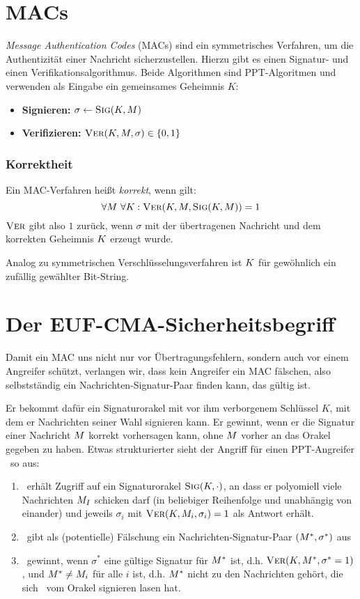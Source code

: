 \section{MACs}
\label{ch:symauth:macs} 
\textit{Message Authentication Codes} (MACs) sind ein symmetrisches
Verfahren, um die Authentizität einer Nachricht sicherzustellen. Hierzu
gibt es einen Signatur- und einen Verifikationsalgorithmus. Beide
Algorithmen sind PPT-Algoritmen und verwenden als Eingabe ein
gemeinsames Geheimnis $K$: 

\begin{itemize}
\item \textbf{Signieren:} $\sigma \leftarrow \textsc{Sig}(K,M)$
\item \textbf{Verifizieren:} $\textsc{Ver}(K,M,\sigma) \in \{0,1\}$
\end{itemize} 
\subsubsection*{Korrektheit}
Ein MAC-Verfahren heißt \textit{korrekt}, wenn gilt:
\[
\forall M~\forall K: \textsc{Ver}(K, M, \textsc{Sig}(K, M)) =1
\]
$\textsc{Ver}$ gibt also $1$ zurück, wenn $\sigma$ mit der übertragenen
Nachricht und  dem korrekten Geheimnis $K$ erzeugt wurde.

Analog zu symmetrischen Verschlüsselungsverfahren ist $K$ für gewöhnlich
ein zufällig gewählter Bit-String.
\section{Der EUF-CMA-Sicherheitsbegriff}
\label{ch:symauth:sicherheit} Damit ein MAC uns nicht nur vor
Übertragungsfehlern, sondern auch vor einem Angreifer schützt, verlangen
wir, dass kein Angreifer ein MAC fälschen, also selbstständig ein Nachrichten-Signatur-Paar
finden kann, das gültig ist.

Er bekommt dafür ein Signaturorakel mit vor ihm verborgenem Schlüssel
$K$, mit dem er Nachrichten seiner Wahl signieren kann. Er gewinnt, wenn
er die Signatur einer Nachricht $M$ korrekt vorhersagen kann, ohne $M$
vorher an das Orakel gegeben zu haben. Etwas strukturierter sieht der
Angriff für einen PPT-Angreifer \A~so aus:
\begin{enumerate}
\item \A~erhält Zugriff auf ein Signaturorakel
  $\textsc{Sig}(K,\cdot)$, an dass er polyomiell viele Nachrichten $M_I$
  schicken darf (in beliebiger Reihenfolge und unabhängig von einander)
  und jeweils $\sigma_i$ mit $\textsc{Ver}(K, M_i, \sigma_i)=1$ als Antwort erhält.
\item \A~gibt als (potentielle) Fälschung ein Nachrichten-Signatur-Paar
  $(M^*,\sigma^*)$ aus
\item \A~gewinnt, wenn $\sigma^*$ eine gültige Signatur für
  $M^*$ ist, d.h. $\textsc{Ver}(K, M^*, \sigma^* = 1)$, und $M^*
  \neq M_i$ für alle $i$ ist, d.h. $M^*$ nicht zu den
  Nachrichten gehört, die sich \A~vom Orakel signieren lasen hat.
\end{enumerate} 

